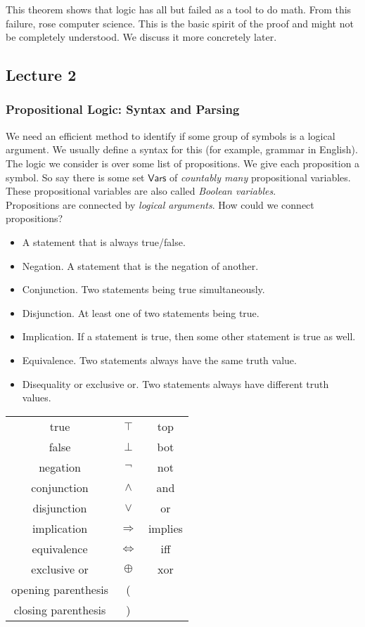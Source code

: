 This theorem shows that logic has all but failed as a tool to do math. From this failure, rose computer science. This is the basic spirit of the proof and might not be completely understood. We discuss it more concretely later.

\subsection{Lecture 2}

\subsubsection{Propositional Logic: Syntax and Parsing}

We need an efficient method to identify if some group of symbols is a logical argument. We usually define a syntax for this (for example, grammar in English).\\

The logic we consider is over some list of propositions. We give each proposition a symbol. So say there is some set $\mathsf{Vars}$ of \textit{countably many} propositional variables.
These propositional variables are also called \textit{Boolean variables}.\\
Propositions are connected by \textit{logical arguments}. How could we connect propositions?
\begin{itemize}
    \item A statement that is always true/false.
    \item Negation. A statement that is the negation of another.
    \item Conjunction. Two statements being true simultaneously.
    \item Disjunction. At least one of two statements being true.
    \item Implication. If a statement is true, then some other statement is true as well.
    \item Equivalence. Two statements always have the same truth value.
    \item Disequality or exclusive or. Two statements always have different truth values.
\end{itemize}

\begin{center}
\begin{tabular}{c|c|c}
     true & $\top$ & top  \\
     false & $\perp$ & bot \\
     negation & $\neg$ & not \\
     conjunction & $\wedge$ & and \\
     disjunction & $\vee$ & or \\
     implication & $\Rightarrow$ & implies \\
     equivalence & $\iff$ & iff \\
     exclusive or & $\oplus$ & xor \\
     opening parenthesis & ( & \\
     closing parenthesis & ) &
\end{tabular}
\end{center}


